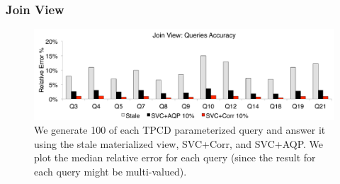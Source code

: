 \subsubsection{Join View}



\begin{figure}[t]\vspace{-2em}
\centering
\includegraphics[scale=0.14]{exp/msj_3.pdf}
 \caption{We generate 100 of each TPCD parameterized query and answer it using the stale materialized view, SVC+Corr, and SVC+AQP. We plot the median relative error for each query (since the result for each query might be multi-valued).\label{exp-1-acc}}
\end{figure}

